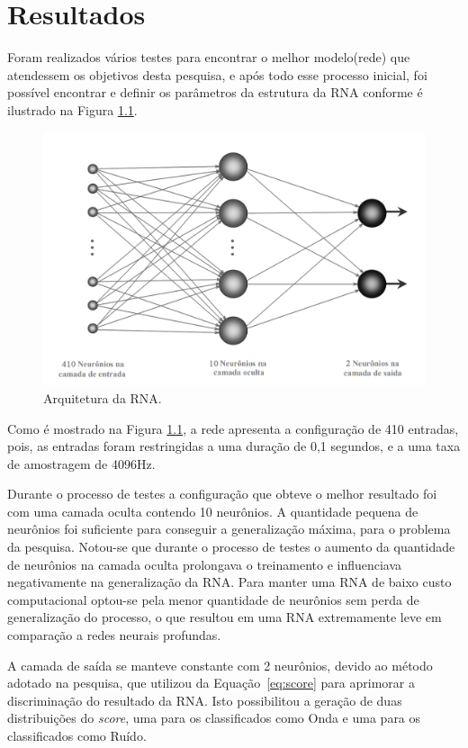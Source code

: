 \chapter{Resultados}

Foram realizados vários testes para encontrar o melhor modelo(rede) que atendessem os objetivos desta pesquisa, e após todo esse processo inicial, foi possível encontrar e definir os parâmetros da estrutura da RNA conforme é ilustrado na Figura \ref{fig:arquiteturarede}.

\begin{figure}[H]
\centering
\includegraphics[width=1\textwidth]{figuras/arquitetura_rede.png}
\caption{Arquitetura da RNA.}
\label{fig:arquiteturarede}
\end{figure}

Como é mostrado na Figura \ref{fig:arquiteturarede}, a rede apresenta a configuração de 410 entradas, pois, as entradas foram restringidas a uma duração de 0,1 segundos, e a uma taxa de amostragem de 4096Hz.

Durante o processo de testes a configuração que obteve o melhor resultado foi com uma camada oculta contendo 10 neurônios. A quantidade pequena de neurônios foi suficiente para conseguir a generalização máxima, para o problema da pesquisa. Notou-se que durante o processo de testes o aumento da quantidade de neurônios na camada oculta prolongava o treinamento e influenciava negativamente na generalização da RNA. Para manter uma RNA de baixo custo computacional optou-se pela menor quantidade de neurônios sem perda de generalização do processo, o que resultou em uma RNA extremamente leve em comparação a redes neurais profundas. 

A camada de saída se manteve constante com 2 neurônios, devido ao método adotado na pesquisa, que utilizou da Equação~\ref{eq:score} para aprimorar a discriminação do resultado da RNA. Isto possibilitou a geração de duas distribuições do \textit{score}, uma para os classificados como Onda e uma para os classificados como Ruído.

